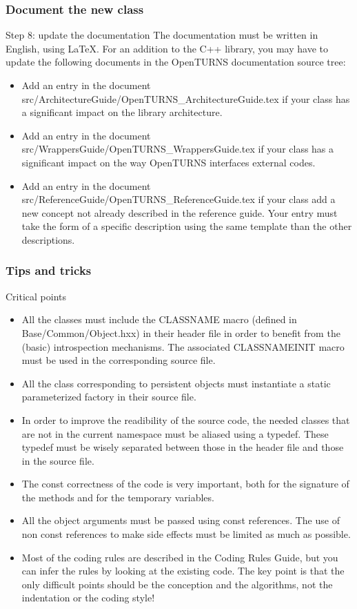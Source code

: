 \documentclass[8pt]{beamer}
\begin{document}
\begin{frame}
  \frametitle{Document the new class}
  \begin{block}{Step 8: update the documentation}
    The documentation must be written in English, using LaTeX. For an addition to the C++ library, you may have to update the following documents in the OpenTURNS documentation source tree:
    \begin{itemize}
    \item Add an entry in the document src/ArchitectureGuide/OpenTURNS\_ArchitectureGuide.tex if your class has a significant impact on the library architecture.
    \item Add an entry in the document src/WrappersGuide/OpenTURNS\_WrappersGuide.tex if your class has a significant impact on the way OpenTURNS interfaces external codes.
    \item Add an entry in the document src/ReferenceGuide/OpenTURNS\_ReferenceGuide.tex if your class add a new concept not already described in the reference guide. Your entry must take the form of a specific description using the same template than the other descriptions.
    \end{itemize}
  \end{block}
\end{frame}
\begin{frame}
  \frametitle{Tips and tricks}
  \begin{block}{Critical points}
    \begin{itemize}
    \item All the classes must include the {\ttfamily CLASSNAME} macro (defined in Base/Common/Object.hxx) in their header file in order to benefit from the (basic) introspection mechanisms. The associated {\ttfamily CLASSNAMEINIT} macro must be used in the corresponding source file.
    \item All the class corresponding to persistent objects must instantiate a static parameterized factory in their source file.
      \item In order to improve the readibility of the source code, the needed classes that are not in the current namespace must be aliased using a typedef. These typedef must be wisely separated between those in the header file and those in the source file.
      \item The const correctness of the code is very important, both for the signature of the methods and for the temporary variables.
      \item All the object arguments must be passed using const references. The use of non const references to make side effects must be limited as much as possible.
      \item Most of the coding rules are described in the Coding Rules Guide, but you can infer the rules by looking at the existing code. \alert{The key point is that the only difficult points should be the conception and the algorithms, not the indentation or the coding style!}
    \end{itemize}
  \end{block}
\end{frame}
\end{document}
